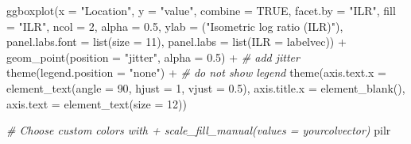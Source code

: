 \documentclass[
]{book}
\newenvironment{Shaded}{\begin{snugshade}}{\end{snugshade}}
\newcommand{\AttributeTok}[1]{\textcolor[rgb]{0.77,0.63,0.00}{#1}}
\newcommand{\CommentTok}[1]{\textcolor[rgb]{0.56,0.35,0.01}{\textit{#1}}}
\newcommand{\ConstantTok}[1]{\textcolor[rgb]{0.00,0.00,0.00}{#1}}
\newcommand{\DecValTok}[1]{\textcolor[rgb]{0.00,0.00,0.81}{#1}}
\newcommand{\FloatTok}[1]{\textcolor[rgb]{0.00,0.00,0.81}{#1}}
\newcommand{\FunctionTok}[1]{\textcolor[rgb]{0.00,0.00,0.00}{#1}}
\newcommand{\NormalTok}[1]{#1}
\newcommand{\SpecialCharTok}[1]{\textcolor[rgb]{0.00,0.00,0.00}{#1}}
\newcommand{\StringTok}[1]{\textcolor[rgb]{0.31,0.60,0.02}{#1}}
\begin{document}
\begin{Shaded}
\begin{Highlighting}[]
  \FunctionTok{ggboxplot}\NormalTok{(}\AttributeTok{x =} \StringTok{"Location"}\NormalTok{, }\AttributeTok{y =} \StringTok{"value"}\NormalTok{, }
    \AttributeTok{combine =} \ConstantTok{TRUE}\NormalTok{, }
    \AttributeTok{facet.by =} \StringTok{"ILR"}\NormalTok{, }
    \AttributeTok{fill =} \StringTok{"ILR"}\NormalTok{, }
    \AttributeTok{ncol =} \DecValTok{2}\NormalTok{, }
    \AttributeTok{alpha =} \FloatTok{0.5}\NormalTok{, }
    \AttributeTok{ylab =}\NormalTok{ (}\StringTok{"Isometric log ratio (ILR)"}\NormalTok{), }
    \AttributeTok{panel.labs.font =} \FunctionTok{list}\NormalTok{(}\AttributeTok{size =} \DecValTok{11}\NormalTok{), }
    \AttributeTok{panel.labs =} \FunctionTok{list}\NormalTok{(}\AttributeTok{ILR =}\NormalTok{ labelvec)) }\SpecialCharTok{+} 
    \FunctionTok{geom\_point}\NormalTok{(}\AttributeTok{position =} \StringTok{"jitter"}\NormalTok{, }\AttributeTok{alpha =} \FloatTok{0.5}\NormalTok{) }\SpecialCharTok{+}  \CommentTok{\# add jitter }
    \FunctionTok{theme}\NormalTok{(}\AttributeTok{legend.position =} \StringTok{"none"}\NormalTok{) }\SpecialCharTok{+}               \CommentTok{\# do not show legend}
    \FunctionTok{theme}\NormalTok{(}\AttributeTok{axis.text.x =} \FunctionTok{element\_text}\NormalTok{(}\AttributeTok{angle =} \DecValTok{90}\NormalTok{, }\AttributeTok{hjust =} \DecValTok{1}\NormalTok{, }
    \AttributeTok{vjust =} \FloatTok{0.5}\NormalTok{), }\AttributeTok{axis.title.x =} \FunctionTok{element\_blank}\NormalTok{(), }\AttributeTok{axis.text =} \FunctionTok{element\_text}\NormalTok{(}\AttributeTok{size =} \DecValTok{12}\NormalTok{))}

\CommentTok{\# Choose custom colors with + scale\_fill\_manual(values = yourcolvector)}
\NormalTok{pilr }
\end{Highlighting}
\end{Shaded}
\end{document}
